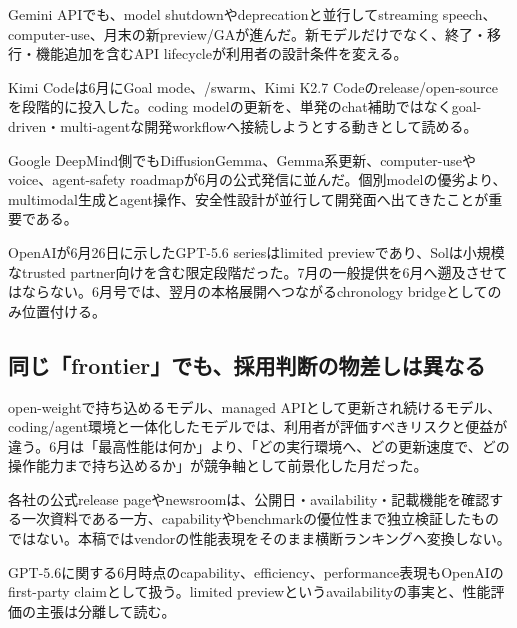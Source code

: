 Gemini APIでも、model shutdownやdeprecationと並行してstreaming speech、computer-use、月末の新preview/GAが進んだ。新モデルだけでなく、終了・移行・機能追加を含むAPI lifecycleが利用者の設計条件を変える。\autocite{src-a24fd97eb3d0}


Kimi Codeは6月にGoal mode、/swarm、Kimi K2.7 Codeのrelease/open-sourceを段階的に投入した。coding modelの更新を、単発のchat補助ではなくgoal-driven・multi-agentな開発workflowへ接続しようとする動きとして読める。\autocite{src-9191d43918fc}


Google DeepMind側でもDiffusionGemma、Gemma系更新、computer-useやvoice、agent-safety roadmapが6月の公式発信に並んだ。個別modelの優劣より、multimodal生成とagent操作、安全性設計が並行して開発面へ出てきたことが重要である。\autocite{src-dd5d9b8662f3}


\begin{claimboundary}
OpenAIが6月26日に示したGPT-5.6 seriesはlimited previewであり、Solは小規模なtrusted partner向けを含む限定段階だった。7月の一般提供を6月へ遡及させてはならない。6月号では、翌月の本格展開へつながるchronology bridgeとしてのみ位置付ける。\autocite{src-30f48121decc}
\end{claimboundary}

\subsection{同じ「frontier」でも、採用判断の物差しは異なる}

open-weightで持ち込めるモデル、managed APIとして更新され続けるモデル、coding/agent環境と一体化したモデルでは、利用者が評価すべきリスクと便益が違う。6月は「最高性能は何か」より、「どの実行環境へ、どの更新速度で、どの操作能力まで持ち込めるか」が競争軸として前景化した月だった。\autocite{src-9191d43918fc,src-a24fd97eb3d0,src-d8e13386974c,src-dd5d9b8662f3,src-eac8dfbeb78c}


\begin{claimboundary}
各社の公式release pageやnewsroomは、公開日・availability・記載機能を確認する一次資料である一方、capabilityやbenchmarkの優位性まで独立検証したものではない。本稿ではvendorの性能表現をそのまま横断ランキングへ変換しない。\autocite{src-9191d43918fc,src-a24fd97eb3d0,src-d8e13386974c,src-dd5d9b8662f3,src-eac8dfbeb78c,src-f6aa679babd7}
\end{claimboundary}

\begin{claimboundary}
GPT-5.6に関する6月時点のcapability、efficiency、performance表現もOpenAIのfirst-party claimとして扱う。limited previewというavailabilityの事実と、性能評価の主張は分離して読む。\autocite{src-30f48121decc}
\end{claimboundary}
